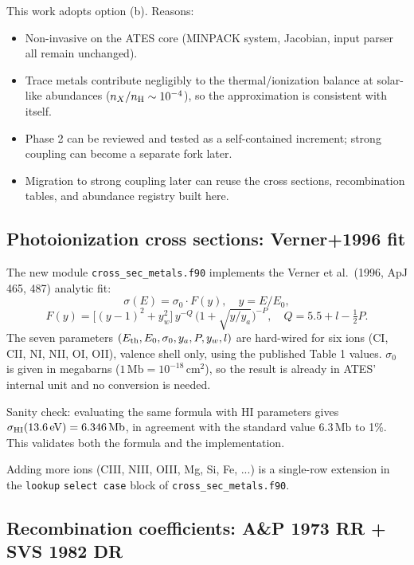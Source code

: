 \documentclass[english,a4paper]{my_memo}
\begin{document}
This work adopts option (b). Reasons:
\begin{itemize}
\item Non-invasive on the ATES core (MINPACK system, Jacobian, input parser
all remain unchanged).
\item Trace metals contribute negligibly to the thermal/ionization balance
at solar-like abundances ($n_X / n_{\rm H} \sim 10^{-4}$), so the
approximation is consistent with itself.
\item Phase 2 can be reviewed and tested as a self-contained increment;
strong coupling can become a separate fork later.
\item Migration to strong coupling later can reuse the cross sections,
recombination tables, and abundance registry built here.
\end{itemize}

\subsection{Photoionization cross sections: Verner+1996 fit}

The new module \texttt{cross\_sec\_metals.f90} implements the Verner et al.\
(1996, ApJ 465, 487) analytic fit:
\[
\sigma(E) = \sigma_0 \cdot F(y), \quad y = E / E_0,
\]
\[
F(y) = \big[(y - 1)^2 + y_w^2 \big]\, y^{-Q}\,\big(1 + \sqrt{y / y_a}\big)^{-P},
\quad Q = 5.5 + l - \tfrac{1}{2} P.
\]
The seven parameters $(E_{\rm th}, E_0, \sigma_0, y_a, P, y_w, l)$ are
hard-wired for six ions (CI, CII, NI, NII, OI, OII), valence shell only,
using the published Table 1 values. $\sigma_0$ is given in megabarns
($1\,\mathrm{Mb} = 10^{-18}\,\mathrm{cm}^2$), so the result is already in
ATES' internal unit and no conversion is needed.

Sanity check: evaluating the same formula with HI parameters gives
$\sigma_{\rm HI}(13.6\,\mathrm{eV}) = 6.346\,\mathrm{Mb}$, in agreement with
the standard value $6.3\,\mathrm{Mb}$ to 1\%. This validates both the formula
and the implementation.

Adding more ions (CIII, NIII, OIII, Mg, Si, Fe, ...) is a single-row
extension in the \texttt{lookup} \texttt{select case} block of
\texttt{cross\_sec\_metals.f90}.

\subsection{Recombination coefficients: A\&P 1973 RR + SVS 1982 DR}
\end{document}

